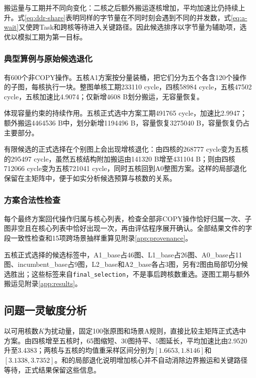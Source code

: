 搬运量与工期并不同向变化：二核之后额外搬运逐核增加，平均加速比仍持续上升。式\eqref{eq:ddr-share}表明同样的字节量在不同时刻会遇到不同的并发数，式\eqref{eq:a-wait}又使跨Task和跨核等待进入关键路径。因此候选排序以字节量为辅助项，选优以模拟工期为第一目标。

\subsubsection{典型算例与原始候选退化}
有600个非COPY操作。五核A1方案按分量装桶，把它们分为五个各含120个操作的子图，每核执行一块。整图单核工期233110 cycle，四核58984 cycle，五核47502 cycle，五核加速比4.9074；仅新增4608 B划分搬运，无容量恢复。

体现容量约束的持续作用。五核正式选中方案工期491765 cycle，加速比2.9947；额外搬运4464536 B中，划分新增1194496 B，容量恢复3275040 B，容量恢复仍占主要部分。

有限候选的正式选择在个别图上会出现增核退化：由四核的268777 cycle变为五核的295497 cycle，虽然五核结构附加搬运由141320 B增至431104 B；则由四核712066 cycle变为五核721041 cycle，同时五核回到A0整图方案。这样的局部退化保留在主矩阵中，便于如实分析候选预算与核数的关系。

\subsubsection{方案合法性检查}
每个最终方案回代操作归属与核心列表，检查全部非COPY操作恰好归属一次、子图非空且在核心列表中恰好出现一次，再由评估程序展开确认。全部结果文件的字段一致性检查和15项跨场景抽样重算见附录\ref{app:provenance}。

五核正式选择的候选标签中，A1\_base占46图、L1\_base占26图、A0\_base占11图、incumbent\_base占9图，L2\_base和A2\_base各占3图，另有2图由局部切分候选胜出；这些标签来自\texttt{final\_selection}，不是事后跨核数重选。逐图工期与额外搬运见附录\ref{app:results}。

\subsection{问题一灵敏度分析}
以可用核数$K$为扰动量，固定100张原图和场景A规则，直接比较主矩阵正式选中方案。由四核增至五核时，65图缩短、30图持平、5图延长，平均加速比由2.9520升至3.4383；两核与五核的均值重采样区间分别为$[1.6653,1.8146]$和$[3.1338,3.7352]$。和的局部退化说明增加核心并不自动消除边界搬运和关键路径等待，正式结果保留这些信息。
